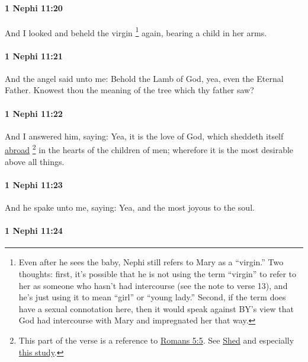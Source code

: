 		\paragraph{1 Nephi 11:20} %
			\label{1NEPHI-11-20}

			And I looked and beheld the virgin%
				\footnote{%
					Even after he sees the baby, Nephi still refers to Mary as a ``virgin.'' Two thoughts: first, it's possible that he is not using the term ``virgin'' to refer to her as someone who hasn't had intercourse (see the note to verse 13), and he's just using it to mean ``girl'' or ``young lady.'' Second, if the term does have a sexual connotation here, then it would speak against BY's view that God had intercourse with Mary and impregnated her that way.
					}
			again,
			bearing a child in her arms.

		\paragraph{1 Nephi 11:21} %
			\label{1NEPHI-11-21}

			And the angel said unto me:
			Behold the Lamb of God, yea, even the Eternal Father.
			Knowest thou the meaning of the tree which thy father saw?

		\paragraph{1 Nephi 11:22} %
			\label{1NEPHI-11-22}

			And I answered him, saying:
			Yea, it is the love of God,
			which sheddeth itself \hyperref[ABROAD]{abroad}%
				\footnote{%
					This part of the verse is a reference to \hyperref[ROMANS-5-5]{Romans 5:5}. See \hyperref[SHED]{Shed} and especially \hyperref[SHED-abroad]{this study}.
					}
			in the hearts of the children of men;
			wherefore it is the most desirable above all things.

		\paragraph{1 Nephi 11:23} %
			\label{1NEPHI-11-23}

			And he spake unto me, saying:
			Yea, and the most joyous to the soul.

		\paragraph{1 Nephi 11:24} %
			\label{1NEPHI-11-24}

